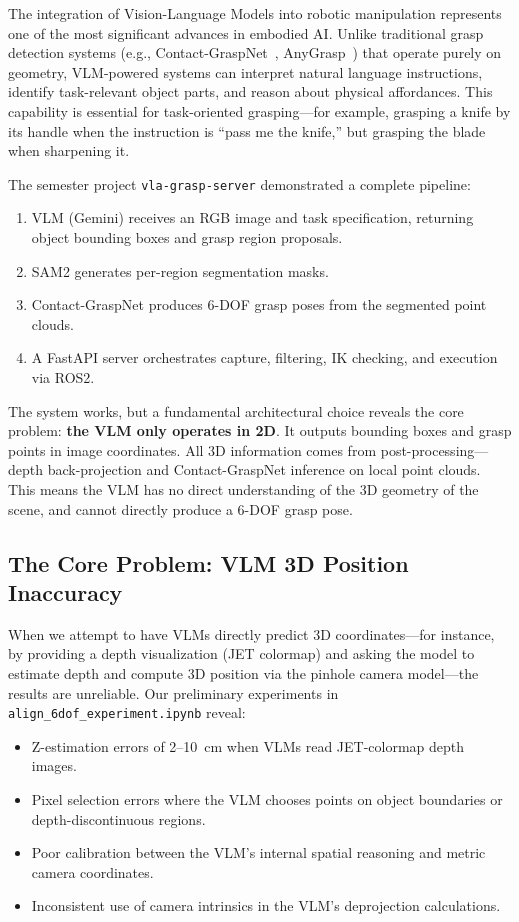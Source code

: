 \documentclass[11pt,a4paper]{article}
\begin{document}
The integration of Vision-Language Models into robotic manipulation represents one of the most significant advances in embodied AI. Unlike traditional grasp detection systems (e.g., Contact-GraspNet~\cite{sundermeyer2021contact}, AnyGrasp~\cite{fang2023anygrasp}) that operate purely on geometry, VLM-powered systems can interpret natural language instructions, identify task-relevant object parts, and reason about physical affordances. This capability is essential for task-oriented grasping---for example, grasping a knife by its handle when the instruction is ``pass me the knife,'' but grasping the blade when sharpening it.

The semester project \texttt{vla-grasp-server} demonstrated a complete pipeline:
\begin{enumerate}[nosep]
    \item VLM (Gemini) receives an RGB image and task specification, returning object bounding boxes and grasp region proposals.
    \item SAM2 generates per-region segmentation masks.
    \item Contact-GraspNet produces 6-DOF grasp poses from the segmented point clouds.
    \item A FastAPI server orchestrates capture, filtering, IK checking, and execution via ROS2.
\end{enumerate}

The system works, but a fundamental architectural choice reveals the core problem: \textbf{the VLM only operates in 2D}. It outputs bounding boxes and grasp points in image coordinates. All 3D information comes from post-processing---depth back-projection and Contact-GraspNet inference on local point clouds. This means the VLM has no direct understanding of the 3D geometry of the scene, and cannot directly produce a 6-DOF grasp pose.

\subsection{The Core Problem: VLM 3D Position Inaccuracy}

When we attempt to have VLMs directly predict 3D coordinates---for instance, by providing a depth visualization (JET colormap) and asking the model to estimate depth and compute 3D position via the pinhole camera model---the results are unreliable. Our preliminary experiments in \texttt{align\_6dof\_experiment.ipynb} reveal:

\begin{itemize}[nosep]
    \item Z-estimation errors of 2--10~cm when VLMs read JET-colormap depth images.
    \item Pixel selection errors where the VLM chooses points on object boundaries or depth-discontinuous regions.
    \item Poor calibration between the VLM's internal spatial reasoning and metric camera coordinates.
    \item Inconsistent use of camera intrinsics in the VLM's deprojection calculations.
\end{itemize}
\end{document}
